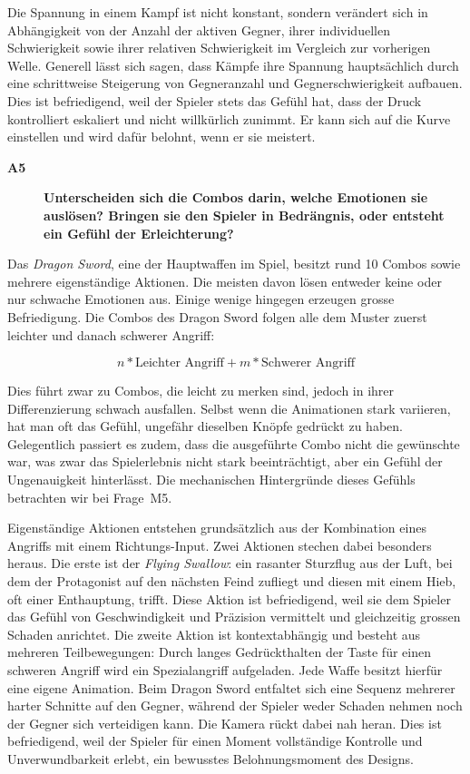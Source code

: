 \documentclass[../Main.tex]{subfiles}
\begin{document}
Die Spannung in einem Kampf ist nicht konstant, sondern verändert sich in Abhängigkeit von der Anzahl der aktiven Gegner, ihrer individuellen Schwierigkeit sowie ihrer relativen Schwierigkeit im Vergleich zur vorherigen Welle. Generell lässt sich sagen, dass Kämpfe ihre Spannung hauptsächlich durch eine schrittweise Steigerung von Gegneranzahl und Gegnerschwierigkeit aufbauen. Dies ist befriedigend, weil der Spieler stets das Gefühl hat, dass der Druck kontrolliert eskaliert und nicht willkürlich zunimmt. Er kann sich auf die Kurve einstellen und wird dafür belohnt, wenn er sie meistert.

\begin{description}
    \item[\textbf{A5}] \textbf{Unterscheiden sich die Combos darin, welche Emotionen sie auslösen? Bringen sie den Spieler in Bedrängnis, oder entsteht ein Gefühl der Erleichterung?}
\end{description}

Das \textit{Dragon Sword}, eine der Hauptwaffen im Spiel, besitzt rund 10 Combos sowie mehrere eigenständige Aktionen. Die meisten davon lösen entweder keine oder nur schwache Emotionen aus. Einige wenige hingegen erzeugen grosse Befriedigung. Die Combos des Dragon Sword folgen alle dem Muster zuerst leichter und danach schwerer Angriff:

\begin{equation*}
    n * \text{Leichter Angriff} + m * \text{Schwerer Angriff}
\end{equation*}

Dies führt zwar zu Combos, die leicht zu merken sind, jedoch in ihrer Differenzierung schwach ausfallen. Selbst wenn die Animationen stark variieren, hat man oft das Gefühl, ungefähr dieselben Knöpfe gedrückt zu haben. Gelegentlich passiert es zudem, dass die ausgeführte Combo nicht die gewünschte war, was zwar das Spielerlebnis nicht stark beeinträchtigt, aber ein Gefühl der Ungenauigkeit hinterlässt. Die mechanischen Hintergründe dieses Gefühls betrachten wir bei Frage~M5.

Eigenständige Aktionen entstehen grundsätzlich aus der Kombination eines Angriffs mit einem Richtungs-Input. Zwei Aktionen stechen dabei besonders heraus. Die erste ist der \textit{Flying Swallow}: ein rasanter Sturzflug aus der Luft, bei dem der Protagonist auf den nächsten Feind zufliegt und diesen mit einem Hieb, oft einer Enthauptung, trifft. Diese Aktion ist befriedigend, weil sie dem Spieler das Gefühl von Geschwindigkeit und Präzision vermittelt und gleichzeitig grossen Schaden anrichtet. Die zweite Aktion ist kontextabhängig und besteht aus mehreren Teilbewegungen: Durch langes Gedrückthalten der Taste für einen schweren Angriff wird ein Spezialangriff aufgeladen. Jede Waffe besitzt hierfür eine eigene Animation. Beim Dragon Sword entfaltet sich eine Sequenz mehrerer harter Schnitte auf den Gegner, während der Spieler weder Schaden nehmen noch der Gegner sich verteidigen kann. Die Kamera rückt dabei nah heran. Dies ist befriedigend, weil der Spieler für einen Moment vollständige Kontrolle und Unverwundbarkeit erlebt, ein bewusstes Belohnungsmoment des Designs.
\end{document}
